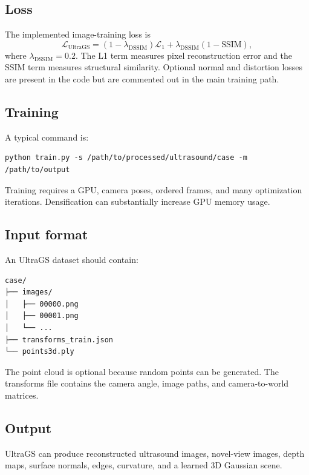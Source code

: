 \documentclass[11pt,a4paper]{article}
\begin{document}
\subsection{Loss}
The implemented image-training loss is
\begin{equation}
    \mathcal{L}_{\mathrm{UltraGS}}
    = (1-\lambda_{\mathrm{DSSIM}})\mathcal{L}_{1}
    + \lambda_{\mathrm{DSSIM}}(1-\mathrm{SSIM}),
\end{equation}
where $\lambda_{\mathrm{DSSIM}}=0.2$. The L1 term measures pixel reconstruction error and the SSIM term measures structural similarity. Optional normal and distortion losses are present in the code but are commented out in the main training path.

\subsection{Training}
A typical command is:
\begin{verbatim}
python train.py -s /path/to/processed/ultrasound/case -m /path/to/output
\end{verbatim}
Training requires a GPU, camera poses, ordered frames, and many optimization iterations. Densification can substantially increase GPU memory usage.

\subsection{Input format}
An UltraGS dataset should contain:
\begin{verbatim}
case/
├── images/
│   ├── 00000.png
│   ├── 00001.png
│   └── ...
├── transforms_train.json
└── points3d.ply
\end{verbatim}
The point cloud is optional because random points can be generated. The transforms file contains the camera angle, image paths, and camera-to-world matrices.

\subsection{Output}
UltraGS can produce reconstructed ultrasound images, novel-view images, depth maps, surface normals, edges, curvature, and a learned 3D Gaussian scene.
\end{document}
